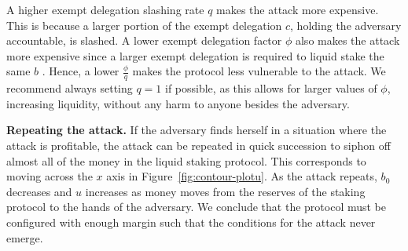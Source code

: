 A higher exempt delegation slashing rate $q$ makes the attack more expensive. This
is because a larger portion of the exempt delegation $c$, holding the adversary accountable,
is slashed. A lower exempt delegation factor $\phi$ also makes the attack more expensive
since a larger exempt delegation is required to liquid stake the same $b$ \asset.
Hence, a lower $\frac{\phi}{q}$ makes the protocol less vulnerable to the attack.
We recommend always setting $q = 1$ if possible, as this allows for
larger values of $\phi$, increasing liquidity, without any harm to anyone
besides the adversary.


\noindent
\textbf{Repeating the attack.} If the adversary finds herself in a situation
where the attack is profitable, the attack can be repeated in quick succession
to siphon off almost all of the money in the liquid staking protocol.
This corresponds to moving across the $x$ axis in Figure~\ref{fig:contour-plotu}.
As the attack repeats, $b_0$ decreases and $u$ increases as money moves from
the reserves of the staking protocol to the hands of the adversary.
We conclude that the protocol must be configured with enough margin
such that the conditions for the attack never emerge.



